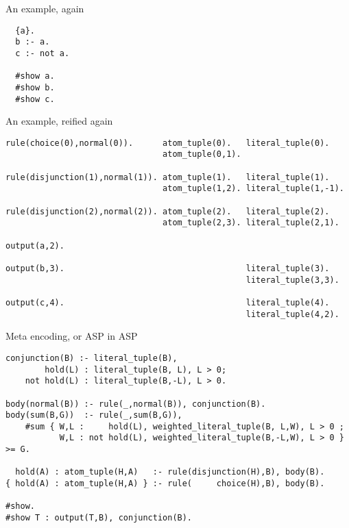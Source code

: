 \begin{frame}[fragile]{An example, again}
\bigskip
\begin{lstlisting}
  {a}.
  b :- a.
  c :- not a.

  #show a.
  #show b.
  #show c.
\end{lstlisting}
\end{frame}
\begin{frame}[fragile,shrink=28]{An example, reified again}
\bigskip
\begin{lstlisting}
rule(choice(0),normal(0)).      atom_tuple(0).   literal_tuple(0).
                                atom_tuple(0,1).

rule(disjunction(1),normal(1)). atom_tuple(1).   literal_tuple(1).
                                atom_tuple(1,2). literal_tuple(1,-1).

rule(disjunction(2),normal(2)). atom_tuple(2).   literal_tuple(2).
                                atom_tuple(2,3). literal_tuple(2,1).

output(a,2).

output(b,3).                                     literal_tuple(3).
                                                 literal_tuple(3,3).

output(c,4).                                     literal_tuple(4).
                                                 literal_tuple(4,2).
\end{lstlisting}
\end{frame}
\begin{frame}[fragile,shrink=34]{Meta encoding, or ASP in ASP}
\bigskip
\begin{lstlisting}
conjunction(B) :- literal_tuple(B),
        hold(L) : literal_tuple(B, L), L > 0;
    not hold(L) : literal_tuple(B,-L), L > 0.

body(normal(B)) :- rule(_,normal(B)), conjunction(B).
body(sum(B,G))  :- rule(_,sum(B,G)),
    #sum { W,L :     hold(L), weighted_literal_tuple(B, L,W), L > 0 ;
           W,L : not hold(L), weighted_literal_tuple(B,-L,W), L > 0 } >= G.

  hold(A) : atom_tuple(H,A)   :- rule(disjunction(H),B), body(B).
{ hold(A) : atom_tuple(H,A) } :- rule(     choice(H),B), body(B).

#show.
#show T : output(T,B), conjunction(B).
\end{lstlisting}
\end{frame}
